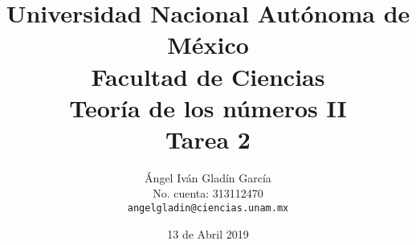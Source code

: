 \documentclass[letterpaper]{article}
\begin{document}
\title{
    \vspace{-2.2em}
        Universidad Nacional Autónoma de México\\
        Facultad de Ciencias\\
        Teoría de los números II\\
    \vspace{.5cm}
    \large
        \textbf{Tarea 2}
}
\author{
    Ángel Iván Gladín García\\
    No. cuenta: 313112470\\
    \texttt{angelgladin@ciencias.unam.mx}
}
\date{13 de Abril 2019}
\maketitle

\newtheorem{theorem}{Teorema}
\newtheorem{example}{Ejemplo}
\newtheorem{corollary}{Corolario}
\newtheorem{lemma}{Lemma}
\newtheorem{definition}{Definicion}
\newtheorem{prop}{Proposicion}
\end{document}
